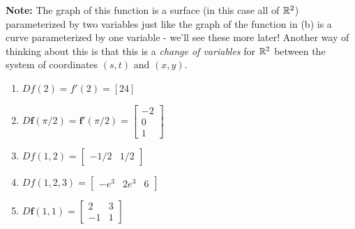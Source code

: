 \begin{enumerate}
{\begin{enumerate}
		\textbf{Note:} The graph of this function is a surface (in this case all of $\mathbb{R}^2$) parameterized by two variables just like the graph of the function in (b) is a curve parameterized by one variable - we'll see these more later!  Another way of thinking about this is that this is a \textit{change of variables} for $\mathbb{R}^2$ between the system of coordinates $(s,t)$ and $(x,y)$.
	\end{enumerate}
	}
	{ %
	\begin{multicols}{2}
		\begin{enumerate}
		\item $Df(2)=f'(2)=[24]$
		\item $D\mathbf{f}(\pi/2)=\mathbf{f}'(\pi/2)=\begin{bmatrix}
			-2 \\ 0 \\ 1
		\end{bmatrix}$
		\item $Df(1,2)=\begin{bmatrix}
			-1/2 & 1/2
		\end{bmatrix}$
		\item $Df(1,2,3)=\begin{bmatrix}
			-e^3 & 2e^3 & 6
		\end{bmatrix}$
		\item $D\mathbf{f}(1,1) = \begin{bmatrix}
			2 & 3 \\
			-1 &  1
		\end{bmatrix}  $
	\end{enumerate}
	\end{multicols}
	}
	{ %

	}
    
\end{enumerate}
